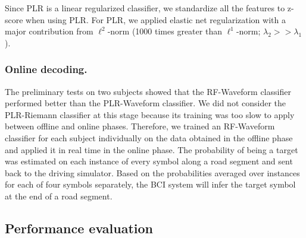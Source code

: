 \documentclass[12pt]{iopart}
\begin{document}
Since PLR is a linear regularized classifier,
we standardize all the features to z-score when
using PLR. For PLR, we applied elastic net regularization
with a major contribution from $\ell^2$-norm (1000 times greater than $\ell^1$-norm; $\lambda_2 >> \lambda_1$).




\subsubsection*{Online decoding.}
The preliminary tests on two subjects showed that the RF-Waveform classifier
performed better than the PLR-Waveform classifier. We did not consider the
PLR-Riemann classifier at this stage because its training
was too slow to apply between offline and online phases.
Therefore, we trained an RF-Waveform classifier  for each subject individually on the data obtained in the offline phase 
and applied it in real time in the online phase.
The probability of being a target was estimated on each instance of every symbol along a road segment and sent back to the driving simulator. Based on the probabilities averaged over instances for each of four symbols separately, the BCI system will infer the target symbol at the end of a road segment.


\subsection{Performance evaluation}
\end{document}
